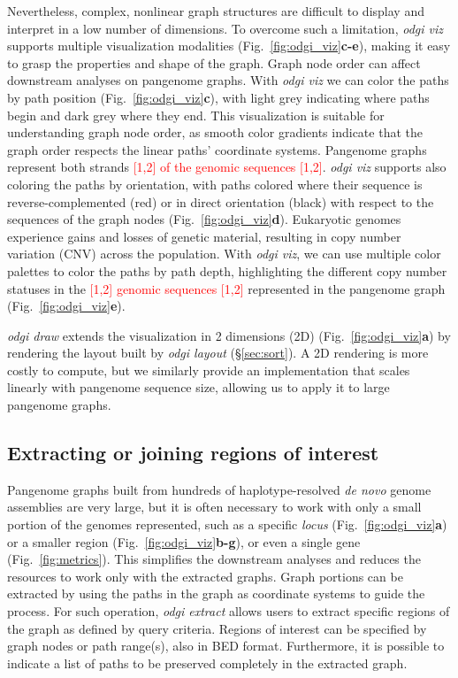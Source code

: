 \documentclass{bioinfo}
\newcommand{\REVIEWED}[1]{{\textcolor{Red}{#1}}}
\begin{document}
Nevertheless, complex, nonlinear graph structures are difficult to display and interpret in a low number of dimensions.
To overcome such a limitation, \textit{odgi viz} supports multiple visualization modalities (Fig.~\ref{fig:odgi_viz}\textbf{c-e}), making it easy to grasp the properties and shape of the graph.
Graph node order can affect downstream analyses on pangenome graphs.
With \textit{odgi viz} we can color the paths by path position (Fig.~\ref{fig:odgi_viz}\textbf{c}), with light grey indicating where paths begin and dark grey where they end.
This visualization is suitable for understanding graph node order, as smooth color gradients indicate that the graph order respects the linear paths' coordinate systems.
Pangenome graphs represent both strands \REVIEWED{[1,2] of the genomic sequences [1,2]}.
\textit{odgi viz} supports also coloring the paths by orientation, with paths colored where their sequence is reverse-complemented (red) or in direct orientation (black) with respect to the sequences of the graph nodes (Fig.~\ref{fig:odgi_viz}\textbf{d}).
Eukaryotic genomes experience gains and losses of genetic material, resulting in copy number variation (CNV) across the population.
With \textit{odgi viz}, we can use multiple color palettes to color the paths by path depth, highlighting the different copy number statuses in the \REVIEWED{[1,2] genomic sequences [1,2]} represented in the pangenome graph (Fig.~\ref{fig:odgi_viz}\textbf{e}).

\textit{odgi draw} extends the visualization in 2 dimensions (2D)  (Fig.~\ref{fig:odgi_viz}\textbf{a}) by rendering the layout built by \textit{odgi layout} (\S\ref{sec:sort}).
A 2D rendering is more costly to compute, but we similarly provide an implementation that scales linearly with pangenome sequence size, allowing us to apply it to large pangenome graphs.


\subsection{Extracting or joining regions of interest}
\label{sec:extract}

Pangenome graphs built from hundreds of haplotype-resolved \textit{de novo} genome assemblies are very large, but it is often necessary to work with only a small portion of the genomes represented,
such as a specific \textit{locus} (Fig.~\ref{fig:odgi_viz}\textbf{a}) or a smaller region (Fig.~\ref{fig:odgi_viz}\textbf{b-g}), or even a single gene (Fig.~\ref{fig:metrics}).
This simplifies the downstream analyses and reduces the resources to work only with the extracted graphs.
Graph portions can be extracted by using the paths in the graph as coordinate systems to guide the process. For such operation, \textit{odgi extract} allows users to extract specific regions of the graph as defined by query criteria.
Regions of interest can be specified by graph nodes or path range(s), also in BED format. Furthermore, it is possible to indicate a list of paths to be preserved completely in the extracted graph.
\end{document}
